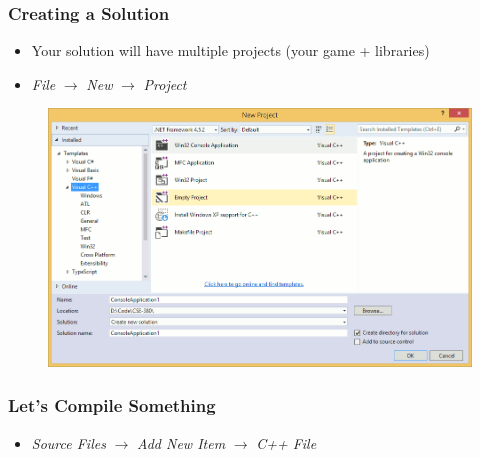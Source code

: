 \documentclass[glossy]{beamer}
\begin{document}
\begin{frame}[fragile=singleslide]
  \frametitle{Creating a Solution}

  \begin{itemize}
    \item Your solution will have multiple projects (your game + libraries)
    \item \emph{File} $\rightarrow$ \emph{New} $\rightarrow$ \emph{Project}
  \end{itemize}

  \begin{figure}
    \centering
    \includegraphics[width=0.85\columnwidth]{windows-10}
  \end{figure}
\end{frame}


\begin{frame}[fragile=singleslide]
  \frametitle{Let's Compile Something}

  \begin{itemize}
    \item \emph{Source Files} $\rightarrow$ \emph{Add New Item} $\rightarrow$ \emph{C++ File}
  \end{itemize}


\end{frame}

\end{document}
